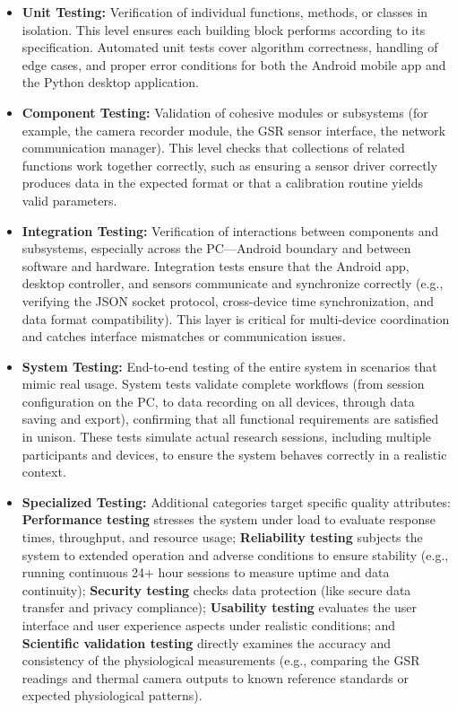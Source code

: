 \begin{itemize}
\item \textbf{Unit Testing:} Verification of individual functions, methods, or
  classes in isolation. This level ensures each building block performs
  according to its specification. Automated unit tests cover algorithm
  correctness, handling of edge cases, and proper error conditions for
  both the Android mobile app and the Python desktop application.
\item \textbf{Component Testing:} Validation of cohesive modules or subsystems
  (for example, the camera recorder module, the GSR sensor interface,
  the network communication manager). This level checks that collections
  of related functions work together correctly, such as ensuring a
  sensor driver correctly produces data in the expected format or that a
  calibration routine yields valid parameters.
\item \textbf{Integration Testing:} Verification of interactions between
  components and subsystems, especially across the PC---Android boundary
  and between software and hardware. Integration tests ensure that the
  Android app, desktop controller, and sensors communicate and
  synchronize correctly (e.g., verifying the JSON socket protocol,
  cross-device time synchronization, and data format compatibility).
  This layer is critical for multi-device coordination and catches
  interface mismatches or communication issues.
\item \textbf{System Testing:} End-to-end testing of the entire system in
  scenarios that mimic real usage. System tests validate complete
  workflows (from session configuration on the PC, to data recording on
  all devices, through data saving and export), confirming that all
  functional requirements are satisfied in unison. These tests simulate
  actual research sessions, including multiple participants and devices,
  to ensure the system behaves correctly in a realistic context.
\item \textbf{Specialized Testing:} Additional categories target specific quality
  attributes: \textbf{Performance testing} stresses the system under load to
  evaluate response times, throughput, and resource usage; \textbf{Reliability
  testing} subjects the system to extended operation and adverse
  conditions to ensure stability (e.g., running continuous 24+ hour
  sessions to measure uptime and data continuity); \textbf{Security testing}
  checks data protection (like secure data transfer and privacy
  compliance); \textbf{Usability testing} evaluates the user interface and
  user experience aspects under realistic conditions; and \textbf{Scientific
  validation testing} directly examines the accuracy and consistency of
  the physiological measurements (e.g., comparing the GSR readings and
  thermal camera outputs to known reference standards or expected
  physiological patterns).

\end{itemize}
